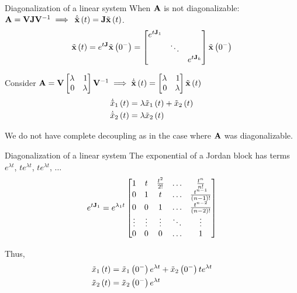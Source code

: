 \documentclass[aspectratio=169]{beamer}
\def\mf{\ensuremath\mathbf}
\def\lp{\ensuremath\left(}
\def\rp{\ensuremath\right)}
\def\bmx{\ensuremath\begin{bmatrix*}[r]}
\def\emx{\ensuremath\end{bmatrix*}}
\def\bmxc{\ensuremath\begin{bmatrix*}[c]}
\newcommand{\ct}[1]{\lp #1\rp}
\begin{document}
\begin{frame}[t]{Diagonalization of a linear system}
When $\mf{A}$ is not diagonalizable: $\mf{A} = \mf{V}\mf{J}\mf{V}^{-1} \implies$ $\dot{\tilde{\mf{x}}}\ct{t} = \mf{J}\tilde{\mf{x}}\ct{t}$.
\[ \tilde{\mf{x}}\ct{t} = e^{t\mf{J}}\tilde{\mf{x}}\ct{0^-} = \bmx 
e^{t\mf{J}_1} & & \\
 & \ddots & \\
 & & e^{t\mf{J}_k}
\emx \tilde{\mf{x}}\ct{0^-} \]

Consider $\mf{A} = \mf{V}\bmx \lambda & 1 \\ 0 & \lambda\emx\mf{V}^{-1} \implies \dot{\tilde{\mf{x}}}\ct{t} = \bmx \lambda & 1 \\ 0 & \lambda\emx\tilde{\mf{x}}\ct{t}$ 
\[ \begin{split}
\dot{\tilde{x}}_1\ct{t} &= \lambda\tilde{x}_1\ct{t} + \tilde{x}_2\ct{t}\\
\dot{\tilde{x}}_2\ct{t} &= \lambda\tilde{x}_2\ct{t}
\end{split}  \]

We do not have complete decoupling as in the case where $\mf{A}$ was diagonalizable.
\end{frame}


\begin{frame}[t]{Diagonalization of a linear system}
The exponential of a Jordan block has terms $e^{\lambda t}$, $te^{\lambda t}$, $te^{\lambda t}$, $\ldots$
\[ e^{t\mf{J}_1} = e^{\lambda_1 t}\bmxc 
1 & t & \frac{t^2}{2!} & \ldots & \frac{t^n}{n!}\\ 
0 & 1 & t & \ldots & \frac{t^{n-1}}{\lp n-1\rp!}\\
0 & 0 & 1 & \ldots & \frac{t^{n-2}}{\lp n-2\rp!}\\
\vdots & \vdots & \vdots & \ddots & \vdots\\
0 & 0 & 0 & \ldots & 1
\emx \]

Thus, 
\[ \begin{split}
\tilde{x}_1\ct{t} &= \tilde{x}_1\ct{0^-}e^{\lambda t} + \tilde{x}_2\ct{0^-}te^{\lambda t}\\
\tilde{x}_2\ct{t} &= \tilde{x}_2\ct{0^-}e^{\lambda t}
\end{split} \]
\end{frame}
\end{document}
